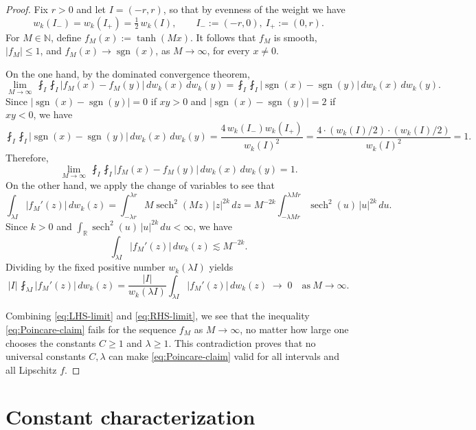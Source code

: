 \documentclass[12pt]{amsart}
\begin{document}
\begin{proof}
Fix $r>0$ and let $I=(-r,r)$, so that by evenness of the weight we have
\[
w_k(I_-)=w_k(I_+)=\tfrac12\,w_k(I),
\qquad I_-:=(-r,0),\ I_+:=(0,r).
\]
For $M\in\mathbb{N}$, define $f_M(x):=\tanh(Mx)$. It follows that  $f_M$ is smooth, $|f_M|\le1$, and $f_M(x)\to\operatorname{sgn}(x)$, as $M\rightarrow \infty$,  for every $x\neq0$.


On the one hand, by the dominated convergence theorem,
\[
\lim_{M\to\infty}\ \fint_I\fint_I |f_M(x)-f_M(y)|\,dw_k(x)\,dw_k(y)
=\fint_I\fint_I |\operatorname{sgn}(x)-\operatorname{sgn}(y)|\,dw_k(x)\,dw_k(y).
\]
Since $|\operatorname{sgn}(x)-\operatorname{sgn}(y)|=0$ if $xy>0$ and $|\operatorname{sgn}(x)-\operatorname{sgn}(y)|=2$ if $xy<0$, we have
\[
\fint_I\fint_I |\operatorname{sgn}(x)-\operatorname{sgn}(y)|\,dw_k(x)\,dw_k(y)
=\frac{4\,w_k(I_-)w_k(I_+)}{w_k(I)^2}
=\frac{4\cdot(w_k(I)/2)\cdot(w_k(I)/2)}{w_k(I)^2}=1.
\]
Therefore,
\begin{equation}\label{eq:LHS-limit}
\lim_{M\to\infty}\ \fint_I\fint_I |f_M(x)-f_M(y)|\,dw_k(x)\,dw_k(y)=1.
\end{equation}
On the other hand, we apply the change of variables to see that
\[
\int_{\lambda I} |f_M'(z)|\,dw_k(z)
=\int_{-\lambda r}^{\lambda r} M\operatorname{sech}^2(Mz)\,|z|^{2k}\,dz
=M^{-2k}\int_{-\lambda Mr}^{\lambda Mr} \operatorname{sech}^2(u)\,|u|^{2k}\,du.
\]
Since $k>0$ and $\int_{\mathbb{R}}\operatorname{sech}^2(u)\,|u|^{2k}\,du<\infty$, we have
\[
\int_{\lambda I} |f_M'(z)|\,dw_k(z)\lesssim M^{-2k}.
\]
Dividing by the fixed positive number $w_k(\lambda I)$ yields
\begin{equation}\label{eq:RHS-limit}
|I|\,\fint_{\lambda I} |f_M'(z)|\,dw_k(z)
=\frac{|I|}{w_k(\lambda I)}\int_{\lambda I}|f_M'(z)|\,dw_k(z)\;\longrightarrow\;0\quad
\text{as}\ M\to\infty.
\end{equation}

\smallskip
Combining \eqref{eq:LHS-limit} and \eqref{eq:RHS-limit}, we see that the inequality \eqref{eq:Poincare-claim} fails for the sequence $f_M$ as $M\to\infty$, no matter how large one chooses the constants $C\ge1$ and $\lambda\ge1$. This contradiction proves that no universal constants $C,\lambda$ can make \eqref{eq:Poincare-claim} valid for all intervals and all Lipschitz $f$.
\end{proof}

\section{Constant characterization}
\setcounter{equation}{0}
\end{document}
